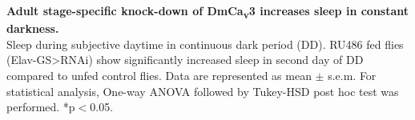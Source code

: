 \label{fig:S}
\textbf{Adult stage-specific knock-down of DmCa\textsubscript{v}3 increases sleep in constant darkness.}
\\
Sleep during subjective daytime in continuous dark period (DD). 
RU486 fed flies (Elav-GS>RNAi) show significantly increased sleep in second day of DD compared to unfed control flies.
Data are represented as mean $\pm$ s.e.m.
For statistical analysis, One-way ANOVA followed by Tukey-HSD post hoc test was performed.
*p$<$0.05.
  


  